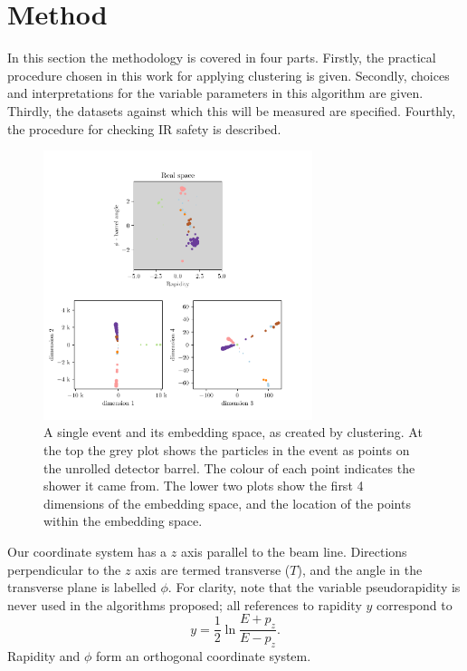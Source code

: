 \section{Method}
In this section the methodology is covered in four parts.
Firstly, the practical procedure chosen in this work for applying \spectral{} clustering  is given.
Secondly, choices and interpretations for the variable parameters in this algorithm are given.
Thirdly,  the datasets against which this will be measured are specified.
Fourthly, the procedure for checking IR safety is described.

    \begin{figure}[!t]
        \center
        \includegraphics[width=0.7\textwidth]{graphics/embedding_space_simple2.pdf}
        \caption{A single event and its embedding space, as created by \spectral{} clustering.
            At the top the grey plot shows the particles in the event as points on the unrolled detector barrel.
            The colour of each point indicates the shower it came from.
            The lower two plots show the first 4 dimensions of the embedding space,
            and the location of the points within the embedding space.}\label{fig:embedding_space_simple}
    \end{figure}    

Our coordinate system has a \(z\) axis parallel to the beam line.
Directions perpendicular to the \(z\) axis are termed transverse (\(T\)), and
the angle in the transverse plane is labelled \(\phi\).
For clarity, note that the variable pseudorapidity is never used
in the algorithms proposed; all references to rapidity $y$ correspond to
\begin{equation}\label{eqn:rapidity}
    y = \frac{1}{2} \ln\frac{E + p_z}{E - p_z}.
\end{equation}
Rapidity and \(\phi\) form an orthogonal coordinate system.

